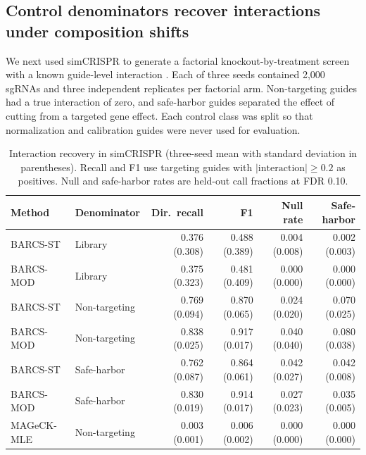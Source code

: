 \subsection{Control denominators recover interactions under composition shifts}
\label{sec:simcrispr}

We next used simCRISPR to generate a factorial knockout-by-treatment screen
with a known guide-level interaction \citep{zhu2026simcrispr}.  Each of three
seeds contained 2,000 sgRNAs and three independent replicates per factorial
arm.  Non-targeting guides had a true interaction of zero, and safe-harbor
guides separated the effect of cutting from a targeted gene effect.  Each
control class was split so that normalization and calibration guides were
never used for evaluation.

\begin{table}[ht]
\centering
\caption{Interaction recovery in simCRISPR (three-seed mean with standard
deviation in parentheses).  Recall and F1
use targeting guides with $|\mathrm{interaction}|\geq0.2$ as positives.  Null
and safe-harbor rates are held-out call fractions at FDR 0.10.}
\label{tab:simcrispr}
\scriptsize
\setlength{\tabcolsep}{2.5pt}
\begin{tabular}{llrrrr}
\toprule
Method & Denominator & Dir.\ recall & F1 & Null rate & Safe-harbor\\
\midrule
BARCS-ST & Library &
0.376 (0.308) & 0.488 (0.389) & 0.004 (0.008) & 0.002 (0.003)\\
BARCS-MOD & Library &
0.375 (0.323) & 0.481 (0.409) & 0.000 (0.000) & 0.000 (0.000)\\
\midrule
BARCS-ST & Non-targeting &
0.769 (0.094) & 0.870 (0.065) & 0.024 (0.020) & 0.070 (0.025)\\
BARCS-MOD & Non-targeting &
0.838 (0.025) & 0.917 (0.017) & 0.040 (0.040) & 0.080 (0.038)\\
\midrule
BARCS-ST & Safe-harbor &
0.762 (0.087) & 0.864 (0.061) & 0.042 (0.027) & 0.042 (0.008)\\
BARCS-MOD & Safe-harbor &
0.830 (0.019) & 0.914 (0.017) & 0.027 (0.023) &
0.035 (0.005)\\
\midrule
MAGeCK-MLE & Non-targeting &
0.003 (0.001) & 0.006 (0.002) & 0.000 (0.000) & 0.000 (0.000)\\
\bottomrule
\end{tabular}
\end{table}

